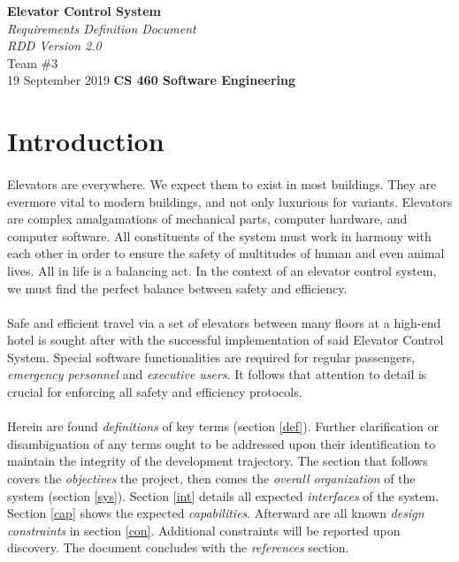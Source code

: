 \documentclass[12pt]{article}
\begin{document}
\begin{titlepage}
\begin{flushleft}
\vspace*{1cm}
\Huge
\textbf{Elevator Control System}\\
\vspace{1cm}
\Huge
\textit{Requirements Definition Document}\\
\vspace{1cm}
\Large
\textit{RDD Version 2.0}\\
\vspace{5cm}
\LARGE
Team \#3\\
19 September 2019
\vfill
\Huge
\textbf{CS 460 Software Engineering}
\end{flushleft}
\end{titlepage}
\normalsize
\tableofcontents
\newpage
\section{Introduction} %
\paragraph{} Elevators are everywhere. We expect them to exist in most buildings. They are evermore vital to modern buildings, and not only luxurious for variants. Elevators are complex amalgamations of mechanical parts, computer hardware, and computer software. All constituents of the system must work in harmony with each other in order to ensure the safety of multitudes of human and even animal lives. All in life is a balancing act. In the context of an elevator control system, we must find the perfect balance between safety and efficiency.
\paragraph{} Safe and efficient travel via a set of elevators between many floors at a high-end hotel is sought after with the successful implementation of said Elevator Control System. Special software functionalities are required for regular passengers, \textit{emergency personnel} and \textit{executive users}. It follows that attention to detail is crucial for enforcing all safety and efficiency protocols.
\paragraph{} Herein are found \textit{definitions} of key terms (section \ref{def}). Further clarification or disambiguation of any terms ought to be addressed upon their identification to maintain the integrity of the development trajectory. The section that follows covers the \textit{objectives} the project, then comes the \textit{overall organization} of the system (section \ref{sys}). Section \ref{int} details all expected \textit{interfaces} of the system. Section \ref{cap} shows the expected \textit{capabilities}. Afterward are all known \textit{design constraints} in section \ref{con}. Additional constraints will be reported upon discovery. The document concludes with the \textit{references} section.
\end{document}
